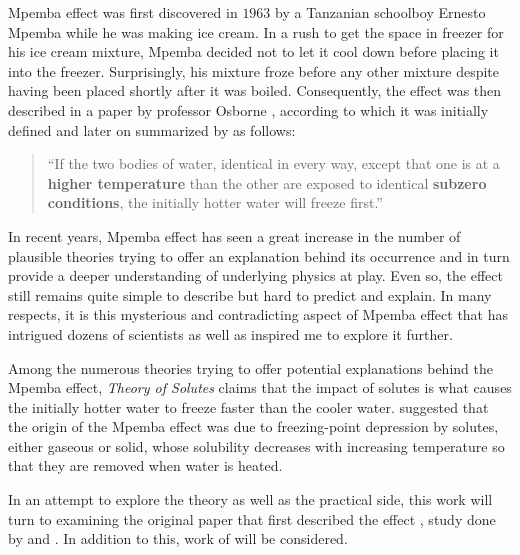 \documentclass[../main.tex]{subfiles}
\begin{document}
\doublespacing
Mpemba effect was first discovered in $1963$ by a Tanzanian schoolboy Ernesto Mpemba while he was making ice cream. In a rush to get the space in freezer for his ice cream mixture, Mpemba decided not to let it cool down before placing it into the freezer. Surprisingly, his mixture froze before any other mixture despite having been placed shortly after it was boiled. Consequently, the effect was then described in a paper by professor Osborne \autocite{mpemba_cool_1969}, according to which it was initially defined and later on summarized by \textcite[514]{jeng_mpemba_2006} as follows:
\begin{quote}
    “If the two bodies of water, identical in every way, except that one is at a \textbf{higher temperature} than the other are exposed to identical \textbf{subzero conditions}, the initially hotter water will freeze first.”
\end{quote}
In recent years, Mpemba effect has seen a great increase in the number of plausible theories trying to offer an explanation behind its occurrence and in turn provide a deeper understanding of underlying physics at play. Even so, the effect still remains quite simple to describe but hard to predict and explain. In many respects, it is this mysterious and contradicting aspect of Mpemba effect that has intrigued dozens of scientists as well as inspired me to explore it further. \par

Among the numerous theories trying to offer potential explanations behind the Mpemba effect, \emph{Theory of Solutes} claims that the impact of solutes is what causes the initially hotter water to freeze faster than the cooler water. \textcite{katz_when_2009} suggested that the origin of the Mpemba effect was due to freezing-point depression by solutes, either gaseous or solid, whose solubility decreases with increasing temperature so that they are removed when water is heated. \par

In an attempt to explore the theory as well as the practical side, this work will turn to examining the original paper that first described the effect \autocite{mpemba_cool_1969}, study done by \textcite{katz_when_2009} and \textcite{thomas_mpemba_nodate}. In addition to this, work of \textcite{pankovic_mpemba_2012} will be considered. \par %
\end{document}
